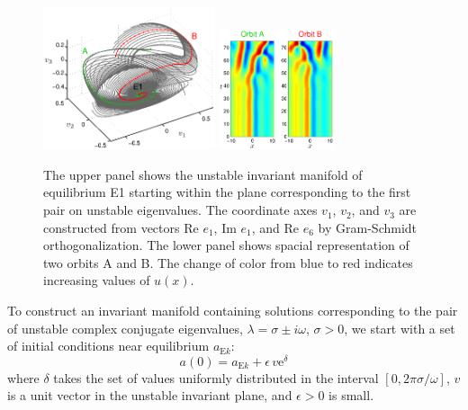 \begin{figure}[h]\vspace*{-5pt} \centering
\includegraphics[width=0.45\textwidth]{figs/ks22_E1_plane1_manifold.eps}
\includegraphics[width=0.3\textwidth]{figs/ks22_E1_plane1_orbits.eps}
\vspace*{-5pt}\caption{ {\small The upper panel shows the unstable
invariant manifold of equilibrium E1 starting within the plane
corresponding to the first pair on unstable eigenvalues. The
coordinate axes $v_1$, $v_2$, and $v_3$ are constructed from vectors
Re $e_1$, Im $e_1$, and Re $e_6$ by Gram-Schmidt orthogonalization.
The lower panel shows spacial representation of two orbits A and B.
The change of color from blue to red indicates increasing values of
$u(x)$.}} \label{f:KS22E1man1}\vspace*{-5pt}
\end{figure}

To construct an invariant manifold containing solutions
corresponding to the pair of unstable complex conjugate eigenvalues,
$\lambda = \sigma\pm i\omega$, $\sigma > 0$, we start with a set of
initial conditions near equilibrium $a_{\mathrm{E}k}$:
\[ a(0) = a_{\mathrm{E}k} + \epsilon\,v\mathrm{e}^{\delta}\]
where $\delta$ takes the set of values uniformly distributed in the
interval $[0,2\pi\sigma/\omega]$, $v$ is a unit vector in the
unstable invariant plane, and $\epsilon > 0$ is small.


